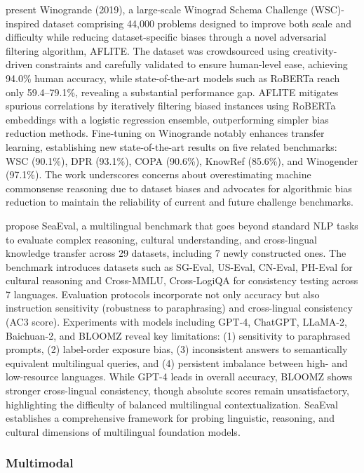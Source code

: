 \documentclass[acmsmall]{acmart}
\begin{document}
\citep{sakaguchi2019winograndeadversarialwinogradschema} present Winogrande (2019), a large-scale Winograd Schema Challenge (WSC)-inspired dataset comprising 44,000 problems designed to improve both scale and difficulty while reducing dataset-specific biases through a novel adversarial filtering algorithm, AFLITE. The dataset was crowdsourced using creativity-driven constraints and carefully validated to ensure human-level ease, achieving 94.0\% human accuracy, while state-of-the-art models such as RoBERTa reach only 59.4–79.1\%, revealing a substantial performance gap. AFLITE mitigates spurious correlations by iteratively filtering biased instances using RoBERTa embeddings with a logistic regression ensemble, outperforming simpler bias reduction methods. Fine-tuning on Winogrande notably enhances transfer learning, establishing new state-of-the-art results on five related benchmarks: WSC (90.1\%), DPR (93.1\%), COPA (90.6\%), KnowRef (85.6\%), and Winogender (97.1\%). The work underscores concerns about overestimating machine commonsense reasoning due to dataset biases and advocates for algorithmic bias reduction to maintain the reliability of current and future challenge benchmarks. 

 \citep{wang2024seaevalmultilingualfoundationmodels} propose SeaEval, a multilingual benchmark that goes beyond standard NLP tasks to evaluate complex reasoning, cultural understanding, and cross-lingual knowledge transfer across 29 datasets, including 7 newly constructed ones. The benchmark introduces datasets such as SG-Eval, US-Eval, CN-Eval, PH-Eval for cultural reasoning and Cross-MMLU, Cross-LogiQA for consistency testing across 7 languages. Evaluation protocols incorporate not only accuracy but also instruction sensitivity (robustness to paraphrasing) and cross-lingual consistency (AC3 score). Experiments with models including GPT-4, ChatGPT, LLaMA-2, Baichuan-2, and BLOOMZ reveal key limitations: (1) sensitivity to paraphrased prompts, (2) label-order exposure bias, (3) inconsistent answers to semantically equivalent multilingual queries, and (4) persistent imbalance between high- and low-resource languages. While GPT-4 leads in overall accuracy, BLOOMZ shows stronger cross-lingual consistency, though absolute scores remain unsatisfactory, highlighting the difficulty of balanced multilingual contextualization. SeaEval establishes a comprehensive framework for probing linguistic, reasoning, and cultural dimensions of multilingual foundation models.

 
\subsubsection{Multimodal}
\noindent
\end{document}
